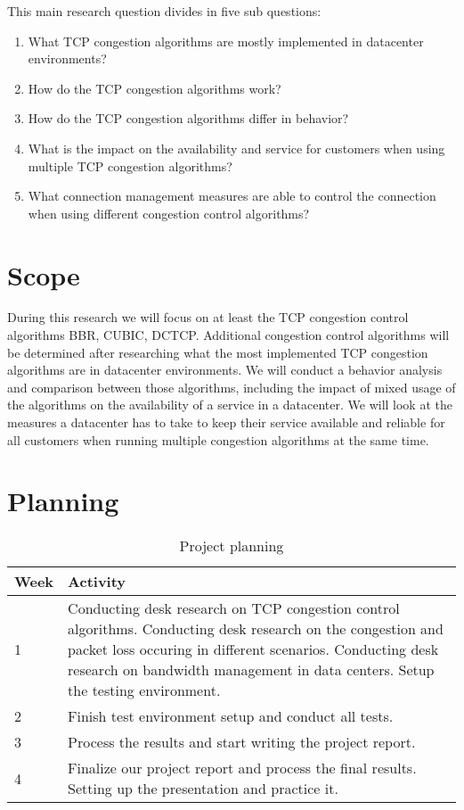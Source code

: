 \documentclass{article}
\begin{document}
This main research question divides in five sub questions:

\begin{enumerate}
	\item What TCP congestion algorithms are mostly implemented in datacenter environments?
	\item How do the TCP congestion algorithms work?
	\item How do the TCP congestion algorithms differ in behavior?
	\item What is the impact on the availability and service for customers when using multiple TCP congestion algorithms?
	\item What connection management measures are able to control the connection when using different congestion control algorithms?
\end{enumerate}


\section{Scope}

During this research we will focus on at least the TCP congestion control
algorithms BBR, CUBIC, DCTCP. Additional congestion control algorithms will be
determined after researching what the most implemented TCP congestion
algorithms are in datacenter environments. We will conduct a behavior analysis
and comparison between those algorithms, including the impact of mixed usage of
the algorithms on the availability of a service in a datacenter. We will look
at the measures a datacenter has to take to keep their service available and
reliable for all customers when running multiple congestion algorithms at the
same time.


\section{Planning}

\begin{table}[H]
	\centering
	\label{my-label}
	\begin{tabular}{l|p{8cm}}
		\textbf{Week} & \textbf{Activity} \\ \hline
		1    & Conducting desk research on TCP congestion control algorithms. Conducting desk research on the congestion and packet loss occuring in different scenarios. Conducting desk research on bandwidth management in data centers. Setup the testing environment. \\
		2    & Finish test environment setup and conduct all tests.\\
		3    & Process the results and start writing the project report.        \\
		4    & Finalize our project report and process the final results. Setting up the presentation and practice it.       
	\end{tabular}
	\caption{Project planning}
\end{table}
\end{document}
